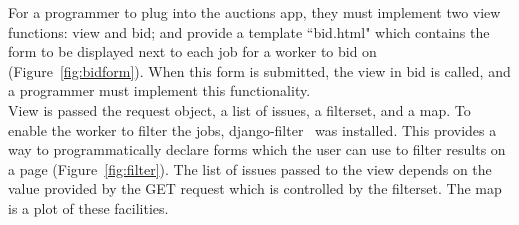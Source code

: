 For a programmer to plug into the auctions app, they must implement two view functions: view and bid; and provide a template ``bid.html" which contains the form to be displayed next to each job for a worker to bid on (Figure~\ref{fig:bidform}). When this form is submitted, the view in bid is called, and a programmer must implement this functionality. \\

View is passed the request object, a list of issues, a filterset, and a map. To enable the worker to filter the jobs, django-filter~\cite{filter} was installed. This provides a way to programmatically declare forms which the user can use to filter results on a page (Figure~\ref{fig:filter}). The list of issues passed to the view depends on the value provided by the GET request which is controlled by the filterset. The map is a plot of these facilities. \\